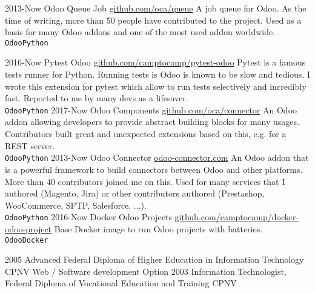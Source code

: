 \documentclass[9pt]{developercv} %
\begin{document}
\begin{entrylist}
	\entry
		{2013-Now}
		{Odoo Queue Job}
		{\href{https://github.com/oca/queue}{github.com/oca/queue}}
		{A job queue for Odoo. As the time of writing, more than 50
      people have contributed to the project. Used as a basis for many 
      Odoo addons and one of the most used addon worldwide.\\
      \texttt{Odoo}\slashsep\texttt{Python}
    }

	\entry
		{2016-Now}
		{Pytest Odoo}
		{\href{https://github.com/camptocamp/pytest-odoo}{github.com/camptocamp/pytest-odoo}}
		{Pytest is a famous tests runner for Python. Running tests is Odoo is known
      to be slow and tedious. I wrote this extension for pytest which allow to
      run tests selectively and incredibly fast. Reported to me by many devs as
      a lifesaver.\\
      \texttt{Odoo}\slashsep\texttt{Python}
    }
	\entry
		{2017-Now}
		{Odoo Components}
		{\href{https://github.com/OCA/connector/tree/13.0/component}{github.com/oca/connector}}
		{An Odoo addon allowing developers to provide abstract building blocks for
      many usages. Contributors built great and unexpected extensions based on
      this, e.g. for a REST server.\\
      \texttt{Odoo}\slashsep\texttt{Python}
    }
	\entry
		{2013-Now}
		{Odoo Connector}
		{\href{https://odoo-connector.com}{odoo-connector.com}}
		{An Odoo addon that is a powerful framework to build connectors between Odoo
and other platforms. More than 40 contributors joined me on this. Used for many
services that I authored (Magento, Jira) or other contributors authored
(Prestashop, WooCommerce, SFTP, Salesforce, ...).\\
      \texttt{Odoo}\slashsep\texttt{Python}
    }
	\entry
		{2016-Now}
		{Docker Odoo Projects}
		{\href{https://github.com/camptocamp/docker-odoo-project}{github.com/camptocamp/docker-odoo-project}}
		{Base Docker image to run Odoo projects with batteries.\\
      \texttt{Odoo}\slashsep\texttt{Docker}
    }
\end{entrylist}



\begin{entrylist}
	\entry
		{2005}
		{Advanced Federal Diploma of Higher Education in Information Technology}
		{CPNV}
		{Web / Software development Option}
	\entry
		{2003}
		{Information Technologist, Federal Diploma of Vocational Education and Training}
		{CPNV}
		{}
\end{entrylist}
\end{document}
